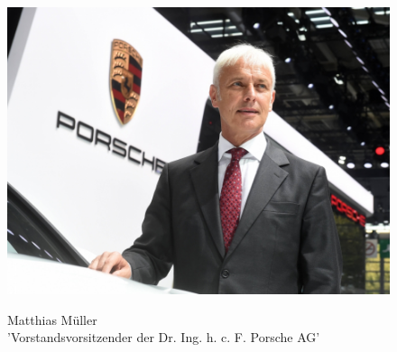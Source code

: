 \documentclass[12pt]{article}
\begin{document}
\begin{figure}[here!]
	\centering
	\begin{minipage}[h]{0.20\textwidth}
		\centering
		\includegraphics[width=1.0\textwidth]{images/MathiasMueller.jpg}
		\label{fig:vorstandvw4}
		\cite{mmpic}
	\end{minipage}
	\begin{minipage}[h]{0.10\textwidth}
		\hspace{1cm} 
	\end{minipage}
	\begin{minipage}[h]{0.65\textwidth}
		Matthias Müller\\
		'Vorstandsvorsitzender der Dr. Ing. h. c. F. Porsche AG'
	\end{minipage}
\end{figure}
\end{document}
